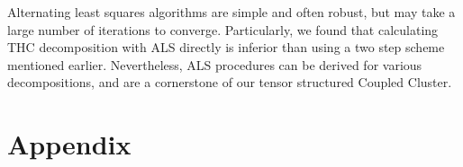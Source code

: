 Alternating least squares algorithms are simple and 
often robust,\cite{uschmajew2012local} but may take a large number of
iterations to converge.\cite{comon2009tensor} Particularly, we found that 
calculating THC decomposition with ALS directly is inferior than using a two 
step scheme mentioned earlier.\cite{schutski2017tensor} Nevertheless, ALS 
procedures can be derived for various decompositions, and are a cornerstone of 
our tensor structured Coupled Cluster.




\section{Appendix}
\label{sec:Appendix} 